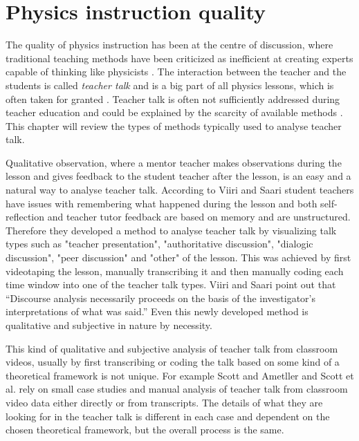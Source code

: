 \documentclass[utf8,english]{gradu3}
\begin{document}


\chapter{Physics instruction quality}
\label{chap:quip}

The quality of physics instruction has been at the centre of discussion, where traditional teaching methods have been criticized as inefficient at creating experts capable of thinking like physicists \parencite{wiemanTransformingPhysicsEducation2007}. The interaction between the teacher and the students is called \emph{teacher talk} and is a big part of all physics lessons, which is often taken for granted \parencite{scottTeachingScienceMeaningful2007}. Teacher talk is often not sufficiently addressed during teacher education and could be explained by the scarcity of available methods \parencite{lehesvuoriDialogicTeachingScience2013,viiriTeacherTalkPatterns2006, crespoPraisingCorrectingProspective2002}. This chapter will review the types of methods typically used to analyse teacher talk.

Qualitative observation, where a mentor teacher makes observations during the lesson and gives feedback to the student teacher after the lesson, is an easy and a natural way to analyse teacher talk. According to Viiri and Saari \parencite*{viiriTeacherTalkPatterns2006} student teachers have issues with remembering what happened during the lesson and both self-reflection and teacher tutor feedback are based on memory and are unstructured. Therefore they developed a method to analyse teacher talk by visualizing talk types such as "teacher presentation", "authoritative discussion", "dialogic discussion", "peer discussion" and "other" of the lesson. This was achieved by first videotaping the lesson, manually transcribing it and then manually coding each time window into one of the teacher talk types. Viiri and Saari \parencite*{viiriTeacherTalkPatterns2006} point out that \enquote{Discourse analysis necessarily proceeds on the basis of the investigator’s interpretations of what was said.} Even this newly developed method is qualitative and subjective in nature by necessity.

This kind of qualitative and subjective analysis of teacher talk from classroom videos, usually by first transcribing or coding the talk based on some kind of a theoretical framework is not unique. For example Scott and Ametller \parencite*{scottTeachingScienceMeaningful2007} and Scott et al. \parencite*{scottPedagogicalLinkMaking2011} rely on small case studies and manual analysis of teacher talk from classroom video data either directly or from transcripts. The details of what they are looking for in the teacher talk is different in each case and dependent on the chosen theoretical framework, but the overall process is the same.
\end{document}
